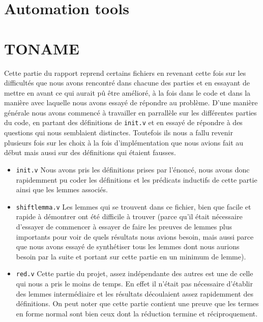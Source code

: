 \documentclass[a4paper,10pt]{scrartcl}
\begin{document}
     \section{Automation tools}
     \section{TONAME}
     Cette partie du rapport reprend certains fichiers en revenant cette fois sur les difficultés que nous avons rencontré dans chacune des parties et en essayant de mettre en avant ce qui aurait pû être amélioré, à la fois dans le code et dans la manière avec laquelle nous avons essayé de répondre au problème. D'une manière générale nous avons commencé à travailler en parrallèle sur les différentes parties du code, en partant des définitions de \texttt{init.v} et en essayé de répondre à des questions qui nous semblaient distinctes. Toutefois ils nous a fallu revenir plusieurs fois sur les choix à la fois d'implémentation que nous avions fait au début mais aussi sur des définitions qui étaient fausses.
     \begin{itemize}
      \item \texttt{init.v} Nous avons pris les définitions prises par l'énoncé, nous avons donc rapidemment pu coder les définitions et les prédicats inductifs de cette partie ainsi que les lemmes associés.
      \item \texttt{shiftlemma.v} Les lemmes qui se trouvent dans ce fichier, bien que facile et rapide à démontrer ont été difficile à trouver (parce qu'il était nécessaire d'essayer de commencer à essayer de faire les preuves de lemmes plus importants pour voir de quels résultats nous avions besoin, mais aussi parce que nous avons essayé de synthétiser tous les lemmes dont nous aurions besoin par la suite et portant sur cette partie en un minimum de lemme).
      \item \texttt{red.v} Cette partie du projet, assez indépendante des autres est une de celle qui nous a pris le moins de temps. En effet il n'était pas nécessaire d'établir des lemmes intermédiaire et les résultats découlaient assez rapidemment des définitions. On peut noter que cette partie contient une preuve que les termes en forme normal sont bien ceux dont la réduction termine et réciproquement.
     \end{itemize}

    
\end{document}
